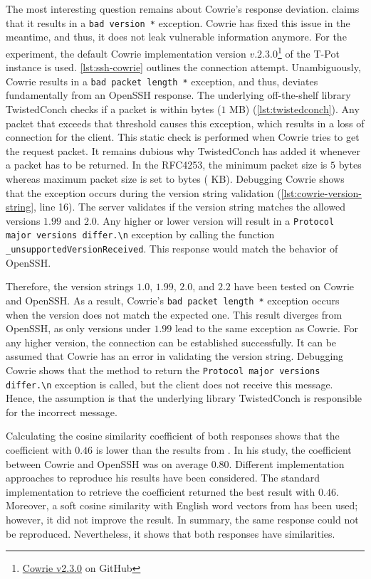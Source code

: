 The most interesting question remains about Cowrie's response deviation.
\citet{vetterl2020} claims that it results in a \verb|bad version *| exception.
Cowrie has fixed this issue in the meantime, and thus, it does not leak vulnerable information anymore.
For the experiment, the default Cowrie implementation version $v.2.3.0$\footnote{\href{https://github.com/cowrie/cowrie/commit/555ff10d95f6239d9d6efee8a2d05def316ab144}{Cowrie v2.3.0} on GitHub} of the T-Pot instance is used.
\autoref{lst:ssh-cowrie} outlines the connection attempt.
Unambiguously, Cowrie results in a \verb|bad packet length *| exception, and thus, deviates fundamentally from an Open\-SSH response.
The underlying off-the-shelf library TwistedConch checks if a packet is within  bytes ($1$ MB) (\autoref{lst:twistedconch}).
Any packet that exceeds that threshold causes this exception, which results in a loss of connection for the client.
This static check is performed when Cowrie tries to get the request packet.
It remains dubious why TwistedConch has added it whenever a packet has to be returned.
In the RFC4253, the minimum packet size is $5$ bytes whereas maximum packet size is set to  bytes ( KB).
Debugging Cowrie shows that the exception occurs during the version string validation (\autoref{lst:cowrie-version-string}, line 16).
The server validates if the version string matches the allowed versions $1.99$ and $2.0$.
Any higher or lower version will result in a \verb|Protocol major versions differ.\n| exception by calling the function \verb|_unsupportedVersionReceived|.
This response would match the behavior of OpenSSH.

Therefore, the version strings $1.0$, $1.99$, $2.0$, and $2.2$ have been tested on Cowrie and OpenSSH.
As a result, Cowrie's \verb|bad packet length *| exception occurs when the version does not match the expected one.
This result diverges from OpenSSH, as only versions under $1.99$ lead to the same exception as Cowrie.
For any higher version, the connection can be established successfully.
It can be assumed that Cowrie has an error in validating the version string.
Debugging Cowrie shows that the method to return the \verb|Protocol major versions differ.\n| exception is called, but the client does not receive this message.
Hence, the assumption is that the underlying library TwistedConch is responsible for the incorrect message.

Calculating the cosine similarity coefficient of both responses shows that the coefficient with $0.46$ is lower than the results from \citet{vetterl2020}.
In his study, the coefficient between Cowrie and OpenSSH was on average $0.80$.
Different implementation approaches to reproduce his results have been considered.
The standard implementation to retrieve the coefficient returned the best result with $0.46$.
Moreover, a soft cosine similarity with English word vectors from \citet{mikolov2018advances} has been used; however, it did not improve the result.
In summary, the same response could not be reproduced.
Nevertheless, it shows that both responses have similarities.

